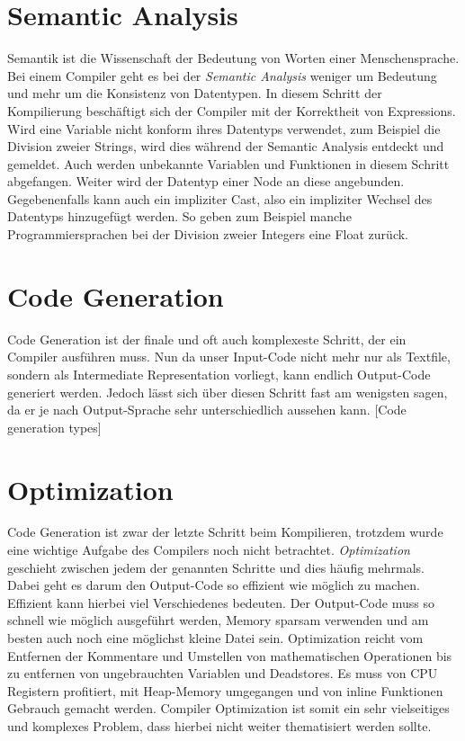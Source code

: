 \section{Semantic Analysis}
Semantik ist die Wissenschaft der Bedeutung von Worten einer Menschensprache. Bei einem Compiler geht es bei der \textit{Semantic Analysis} weniger um Bedeutung und mehr um die Konsistenz von Datentypen.
In diesem Schritt der Kompilierung beschäftigt sich der Compiler mit der Korrektheit von Expressions.
Wird eine Variable nicht konform ihres Datentyps verwendet, zum Beispiel die Division zweier Strings, wird dies während der Semantic Analysis entdeckt und gemeldet.
Auch werden unbekannte Variablen und Funktionen in diesem Schritt abgefangen.
Weiter wird der Datentyp einer Node an diese angebunden. Gegebenenfalls kann auch ein impliziter Cast, also ein impliziter Wechsel des Datentyps hinzugefügt werden.
So geben zum Beispiel manche Programmiersprachen bei der Division zweier Integers eine Float zurück.

\section{Code Generation}
Code Generation ist der finale und oft auch komplexeste Schritt, der ein Compiler ausführen muss. Nun da unser Input-Code nicht mehr nur als Textfile, sondern als Intermediate Representation vorliegt,
kann endlich Output-Code generiert werden. Jedoch lässt sich über diesen Schritt fast am wenigsten sagen, da er je nach Output-Sprache sehr unterschiedlich aussehen kann. 
[Code generation types]

\section{Optimization}
Code Generation ist zwar der letzte Schritt beim Kompilieren, trotzdem wurde eine wichtige Aufgabe des Compilers noch nicht betrachtet. \textit{Optimization} geschieht zwischen jedem der genannten Schritte und dies häufig mehrmals.
Dabei geht es darum den Output-Code so effizient wie möglich zu machen. Effizient kann hierbei viel Verschiedenes bedeuten. Der Output-Code muss so schnell wie möglich ausgeführt werden,
Memory sparsam verwenden und am besten auch noch eine möglichst kleine Datei sein. Optimization reicht vom Entfernen der Kommentare und Umstellen von mathematischen Operationen bis zu entfernen von ungebrauchten Variablen und Deadstores.
Es muss von CPU Registern profitiert, mit Heap-Memory umgegangen und von inline Funktionen Gebrauch gemacht werden. Compiler Optimization ist somit ein sehr vielseitiges und komplexes Problem,
dass hierbei nicht weiter thematisiert werden sollte.